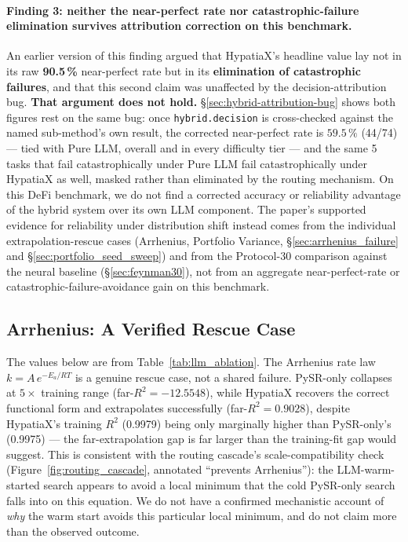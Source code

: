 \documentclass[twoside,11pt]{article}
\newcommand{\Rsq}{R^{2}}
\begin{document}
\paragraph{Finding 3: neither the near-perfect rate nor catastrophic-failure
elimination survives attribution correction on this benchmark.} An earlier
version of this finding argued that HypatiaX's headline value lay not in its
raw \textbf{90.5\,\%} near-perfect rate but in its \textbf{elimination of
catastrophic failures}, and that this second claim was unaffected by the
decision-attribution bug. \textbf{That argument does not hold.}
\S\ref{sec:hybrid-attribution-bug} shows both figures rest on the same bug:
once \texttt{hybrid.decision} is cross-checked against the named sub-method's
own result, the corrected near-perfect rate is $59.5\,\%$ (44/74) --- tied
with Pure LLM, overall and in every difficulty tier --- and the same 5 tasks
that fail catastrophically under Pure LLM fail catastrophically under
HypatiaX as well, masked rather than eliminated by the routing mechanism. On
this DeFi benchmark, we do not find a corrected accuracy or reliability
advantage of the hybrid system over its own LLM component. The paper's
supported evidence for reliability under distribution shift instead comes
from the individual extrapolation-rescue cases (Arrhenius, Portfolio
Variance, \S\ref{sec:arrhenius_failure} and \S\ref{sec:portfolio_seed_sweep})
and from the Protocol-30 comparison against the neural baseline
(\S\ref{sec:feynman30}), not from an aggregate near-perfect-rate or
catastrophic-failure-avoidance gain on this benchmark.

\subsection{Arrhenius: A Verified Rescue Case}\label{subsec:arrhenius-and-scaleincompatibility-failu}
\label{sec:arrhenius_failure}

The values below are from Table~\ref{tab:llm_ablation}. The Arrhenius rate law $k = A\,e^{-E_a / RT}$
is a genuine rescue case, not a shared failure. PySR-only collapses at
$5\times$ training range (far-$\Rsq = -12.5548$), while HypatiaX recovers
the correct functional form and extrapolates successfully (far-$\Rsq =
0.9028$), despite HypatiaX's training $\Rsq$ (0.9979) being only marginally
higher than PySR-only's (0.9975) --- the far-extrapolation gap is far larger
than the training-fit gap would suggest. This is consistent with the
routing cascade's scale-compatibility check (Figure~\ref{fig:routing_cascade},
annotated ``prevents Arrhenius''): the LLM-warm-started search appears to
avoid a local minimum that the cold PySR-only search falls into on this
equation. We do not have a confirmed mechanistic account of \emph{why} the
warm start avoids this particular local minimum, and do not claim more than
the observed outcome.
\end{document}
